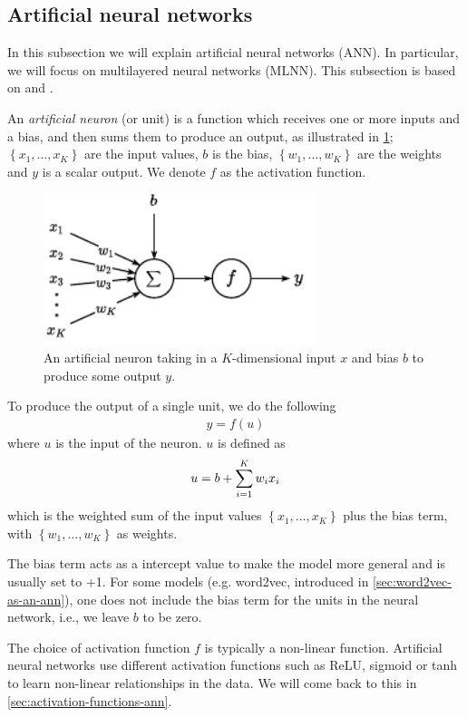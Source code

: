 \subsection{Artificial neural networks}
In this subsection we will explain artificial neural networks (ANN). In particular, we will focus on multilayered neural networks (MLNN). This subsection is based on \cite[Chapter 1]{Aggarwal18} and \cite{rong2016word2vec}.

An \textit{artificial neuron} (or unit) is a function which receives one or more inputs and a bias, and then sums them to produce an output, as illustrated in \cref{fig:artificial_neuron}; $\left\{ x_1, \ldots, x_K \right\}$ are the input values, $b$ is the bias, $\left\{ w_1, \ldots, w_K \right\}$ are the weights and $y$ is a scalar output. We denote $f$ as the activation function.
\begin{figure}[H]
    \centering
    \includegraphics[width=8cm]{thesis/figures/artificial-neuron_cropped.pdf}
    \caption{An artificial neuron taking in a $K$-dimensional input $x$ and bias $b$ to produce some output $y$.}
    \label{fig:artificial_neuron}
\end{figure}

To produce the output of a single unit, we do the following
\begin{align}
    y = f(u)
\end{align}
where $u$ is the input of the neuron. $u$ is defined as
\begin{align}
    u = b + \sum\limits_{i=1}^{K} w_i x_i
\end{align}
which is the weighted sum of the input values $\left\{ x_1, \ldots, x_K \right\}$ plus the bias term, with $\left\{ w_1, \ldots, w_K \right\}$ as weights.

The bias term acts as a intercept value to make the model more general and is usually set to +1. For some models (e.g. word2vec, introduced in \cref{sec:word2vec-as-an-ann}), one does not include the bias term for the units in the neural network, i.e., we leave $b$ to be zero.

The choice of activation function $f$ is typically a non-linear function. Artificial neural networks use different activation functions such as ReLU, sigmoid or tanh to learn non-linear relationships in the data. We will come back to this in \cref{sec:activation-functions-ann}.

